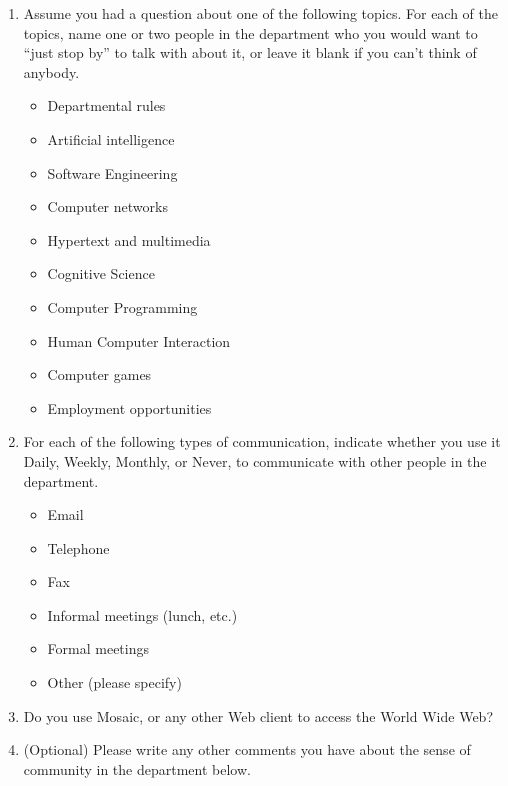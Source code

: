 \begin{enumerate}
\item{Assume you had a question about one of the following topics.  For
  each of the topics, name one or two people in the department who you
  would want to ``just stop by'' to talk with about it, or leave it blank
  if you can't think of anybody.}

  \begin{itemize}
  \item{Departmental rules}
  \item{Artificial intelligence}
  \item{Software Engineering}
  \item{Computer networks}
  \item{Hypertext and multimedia}
  \item{Cognitive Science}
  \item{Computer Programming}
  \item{Human Computer Interaction}
  \item{Computer games}
  \item{Employment opportunities}
  \end{itemize}

\item{For each of the following types of communication, indicate whether
  you use it Daily, Weekly, Monthly, or Never, to communicate with other
  people in the department.}
  \begin{itemize}
  \item{Email}
  \item{Telephone}
  \item{Fax}
  \item{Informal meetings (lunch, etc.)}
  \item{Formal meetings}
  \item{Other (please specify)}
  \end{itemize}

\item{Do you use Mosaic, or any other Web client to access the World Wide
  Web?}

\item{(Optional) Please write any other comments you have about the sense
  of community in the department below.}

\end{enumerate}

\newpage
